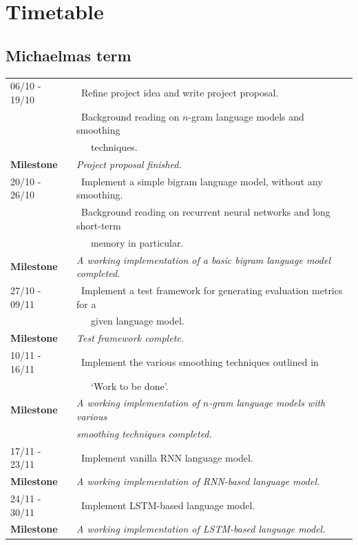 \documentclass[a4paper, 12pt]{article}
\newcommand{\tbf}[1]{\textbf{#1}}
\newcommand{\tit}[1]{\textit{#1}}
\newcommand{\bpt}[0]{\textbullet~}
\begin{document}
\newpage
\section*{Timetable}

\subsection*{Michaelmas term}
\begin{tabular}{l | l}
	06/10 - 19/10 & \bpt Refine project idea and write project proposal. \\
	& \bpt Background reading on $n$-gram language models and smoothing \\
	&~~~techniques. \\
	\tbf{Milestone} & \tit{Project proposal finished.} \\ \hline
	20/10 - 26/10 & \bpt Implement a simple bigram language model, without any smoothing. \\
	& \bpt Background reading on recurrent neural networks and long short-term \\
	&~~~memory in particular. \\
	\tbf{Milestone} & \tit{A working implementation of a basic bigram language model completed.} \\ \hline
	27/10 - 09/11 & \bpt Implement a test framework for generating evaluation metrics for a \\
	&~~~given language model. \\
	\tbf{Milestone} & \tit{Test framework complete.} \\ \hline
	10/11 - 16/11 & \bpt Implement the various smoothing techniques outlined in \\
	&~~~`Work to be done'. \\
	\tbf{Milestone} & \tit{A working implementation of $n$-gram language models with various} \\
	& \tit{smoothing techniques completed.} \\ \hline
	17/11 - 23/11 & \bpt Implement vanilla RNN language model. \\
	\tbf{Milestone} & \tit{A working implementation of RNN-based language model.} \\ \hline
	24/11 - 30/11 & \bpt Implement LSTM-based language model. \\
	\tbf{Milestone} & \tit{A working implementation of LSTM-based language model.} \\ \hline
\end{tabular}
\end{document}
